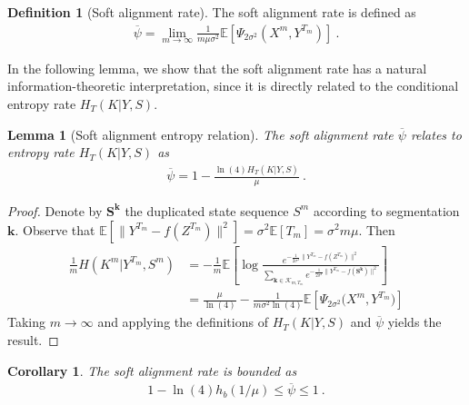 \documentclass[onecolumn]{IEEEtran}
\newtheorem{lemma}{Lemma}
\newtheorem{corollary}{Corollary}
\theoremstyle{definition}
\newtheorem{definition}{Definition}
\begin{document}
\begin{definition}[Soft alignment rate]
The soft alignment rate is defined as
    \begin{align}
        \overline{\psi} = \lim_{m\rightarrow\infty} \frac{1}{ m\mu \sigma^2} \mathbb{E}[\Psi_{2\sigma^2}(X^m,Y^{T_m})]~.
    \end{align}
\end{definition}

In the following lemma, we show that the soft alignment rate has a natural information-theoretic interpretation, since it is directly related to the conditional entropy rate \(H_T(K|Y,S)\).

\begin{lemma}[Soft alignment entropy relation]\label{lemma:sdtwraterelation}
The soft alignment rate $\overline{\psi}$ relates to entropy rate $H_T(K|Y,S)$ as 
\begin{align}
    \overline{\psi} = 1 - \frac{\ln(4)H_T(K|Y,S)}{\mu}~.
\end{align}
\end{lemma}
\begin{proof}
Denote by $\mathbf{S}^{\mathbf{k}}$ the duplicated state sequence $S^m$
according to segmentation $\mathbf{k}$. Observe that
$\mathbb{E}\!\left[\|Y^{T_m}-f(Z^{T_m})\|^2\right]
=\sigma^2\mathbb{E}[T_m]=\sigma^2m\mu$. Then
\begin{align*}
\frac{1}{m} H(K^m|Y^{T_m},S^m)&= -\frac{1}{m}\mathbb{E}\left[\log
\frac{e^{-\frac{1}{2\sigma^2}\|Y^{T_m}-f(Z^{T_m})\|^2}}
{\sum_{\mathbf{k}\in\mathcal{K}_{m,T_m}}
e^{-\frac{1}{2\sigma^2}\|Y^{T_m}-f(\mathbf{S}^{\mathbf{k}})\|^2}}
\right] \\
&= \frac{\mu}{\ln(4)}
-\frac{1}{m\sigma^2 \ln(4)}
\mathbb{E}\!\left[\Psi_{2\sigma^2}
\big(X^m,Y^{T_m}\big)\right]
\end{align*}
{Taking $m\to\infty$ and applying the definitions of
$H_T(K|Y,S)$ and $\overline{\psi}$ yields the result.}
\end{proof}


\begin{corollary}\label{cor:sdtw_ineq}
The soft alignment rate is bounded as
\begin{align}
{1 - \ln(4) h_b(1/\mu)} \leq \overline{\psi} \leq 1~.
\end{align}
\end{corollary}
\end{document}
